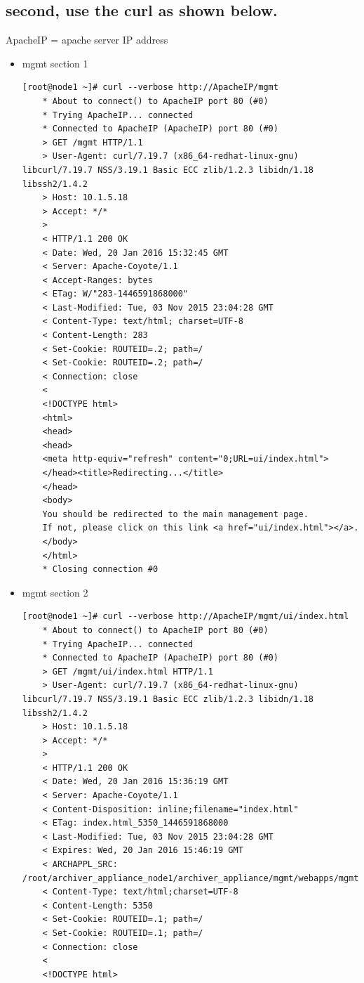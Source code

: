 \documentclass[11pt
  , a4paper
  , article
  , oneside
]{memoir}
\begin{document}
\subsection{second, use the curl as shown below.}
ApacheIP = apache server IP address
\begin{itemize}
	\item mgmt section 1
	\begin{lstlisting}[style=termstyle]
	[root@node1 ~]# curl --verbose http://ApacheIP/mgmt
	* About to connect() to ApacheIP port 80 (#0)
	* Trying ApacheIP... connected
	* Connected to ApacheIP (ApacheIP) port 80 (#0)
	> GET /mgmt HTTP/1.1
	> User-Agent: curl/7.19.7 (x86_64-redhat-linux-gnu) libcurl/7.19.7 NSS/3.19.1 Basic ECC zlib/1.2.3 libidn/1.18 libssh2/1.4.2
	> Host: 10.1.5.18
	> Accept: */*
	> 
	< HTTP/1.1 200 OK
	< Date: Wed, 20 Jan 2016 15:32:45 GMT
	< Server: Apache-Coyote/1.1
	< Accept-Ranges: bytes
	< ETag: W/"283-1446591868000"
	< Last-Modified: Tue, 03 Nov 2015 23:04:28 GMT
	< Content-Type: text/html; charset=UTF-8
	< Content-Length: 283
	< Set-Cookie: ROUTEID=.2; path=/
	< Set-Cookie: ROUTEID=.2; path=/
	< Connection: close
	< 
	<!DOCTYPE html>
	<html>
	<head>
	<head>
	<meta http-equiv="refresh" content="0;URL=ui/index.html">
	</head><title>Redirecting...</title>
	</head>
	<body>
	You should be redirected to the main management page. 
	If not, please click on this link <a href="ui/index.html"></a>. 
	</body>
	</html>
	* Closing connection #0
	\end{lstlisting}
	\item mgmt section 2
	\begin{lstlisting}[style=termstyle]
	[root@node1 ~]# curl --verbose http://ApacheIP/mgmt/ui/index.html
	* About to connect() to ApacheIP port 80 (#0)
	* Trying ApacheIP... connected
	* Connected to ApacheIP (ApacheIP) port 80 (#0)
	> GET /mgmt/ui/index.html HTTP/1.1
	> User-Agent: curl/7.19.7 (x86_64-redhat-linux-gnu) libcurl/7.19.7 NSS/3.19.1 Basic ECC zlib/1.2.3 libidn/1.18 libssh2/1.4.2
	> Host: 10.1.5.18
	> Accept: */*
	> 
	< HTTP/1.1 200 OK
	< Date: Wed, 20 Jan 2016 15:36:19 GMT
	< Server: Apache-Coyote/1.1
	< Content-Disposition: inline;filename="index.html"
	< ETag: index.html_5350_1446591868000
	< Last-Modified: Tue, 03 Nov 2015 23:04:28 GMT
	< Expires: Wed, 20 Jan 2016 15:46:19 GMT
	< ARCHAPPL_SRC: /root/archiver_appliance_node1/archiver_appliance/mgmt/webapps/mgmt/ui/index.html
	< Content-Type: text/html;charset=UTF-8
	< Content-Length: 5350
	< Set-Cookie: ROUTEID=.1; path=/
	< Set-Cookie: ROUTEID=.1; path=/
	< Connection: close
	< 
	<!DOCTYPE html>

\end{lstlisting}
\end{itemize}
\end{document}
